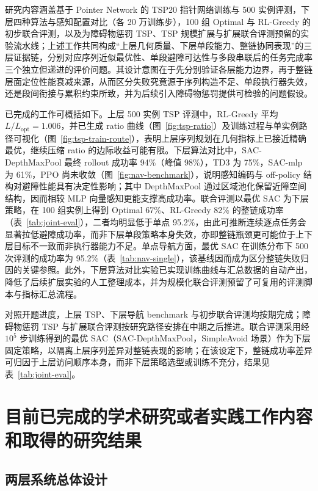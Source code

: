 研究内容涵盖基于 Pointer Network 的 TSP20 指针网络训练与 500 实例评测，下层四种算法与感知配置对比（各 20 万训练步），100 组 Optimal 与 RL-Greedy 的初步联合评测，以及为障碍物惩罚 TSP、TSP 规模扩展与扩展联合评测预留的实验流水线；上述工作共同构成``上层几何质量、下层单段能力、整链协同表现''的三层证据链，分别对应序列近似最优性、单段避障可达性与多段串联后的任务完成率三个独立但递进的评价问题。其设计意图在于先分别验证各层能力边界，再于整链层面定位性能衰减来源，从而区分失败究竟源于序列构造不足、单段执行器失效，还是段间衔接与累积约束所致，并为后续引入障碍物惩罚提供可检验的问题假设。

已完成的工作可概括如下。上层 500 实例 TSP 评测中，RL-Greedy 平均 $L/L_{\mathrm{opt}}=1.006$，并已生成 ratio 曲线（图~\ref{fig:tsp-ratio}）及训练过程与单实例路径可视化（图~\ref{fig:tsp-train-route}），表明上层序列规划在几何指标上已接近精确最优，继续压缩 ratio 的边际收益可能有限。下层算法对比中，SAC-DepthMaxPool 最终 rollout 成功率 94\%（峰值 98\%），TD3 为 75\%，SAC-mlp 为 61\%，PPO 尚未收敛（图~\ref{fig:nav-benchmark}），说明感知编码与 off-policy 结构对避障性能具有决定性影响；其中 DepthMaxPool 通过区域池化保留近障空间结构，因而相较 MLP 向量感知更能支撑高成功率。联合评测以最优 SAC 为下层策略，在 100 组实例上得到 Optimal 67\%、RL-Greedy 82\% 的整链成功率（表~\ref{tab:joint-eval}），二者均明显低于单点 95.2\%，由此可推断连续逐点任务会显著拉低避障成功率，而非下层单段策略本身失效，亦即整链瓶颈更可能位于上下层目标不一致而非执行器能力不足。单点导航方面，最优 SAC 在训练分布下 500 次评测的成功率为 95.2\%（表~\ref{tab:nav-single}），该基线因而成为区分整链失败归因的关键参照。此外，下层算法对比实验已实现训练曲线与汇总数据的自动产出，降低了后续扩展实验的人工整理成本，并为规模化联合评测预留了可复用的评测脚本与指标汇总流程。

对照开题进度，上层 TSP、下层导航 benchmark 与初步联合评测均按期完成；障碍物惩罚 TSP 与扩展联合评测按研究路径安排在中期之后推进。联合评测采用经 $10^5$ 步训练得到的最优 SAC（SAC-DepthMaxPool，SimpleAvoid 场景）作为下层固定策略，以隔离上层序列差异对整链表现的影响；在该设定下，整链成功率差异可归因于上层访问顺序本身，而非下层策略选型或训练不充分，结果见表~\ref{tab:joint-eval}。

\section{目前已完成的学术研究或者实践工作内容和取得的研究结果}

\subsection{两层系统总体设计}

